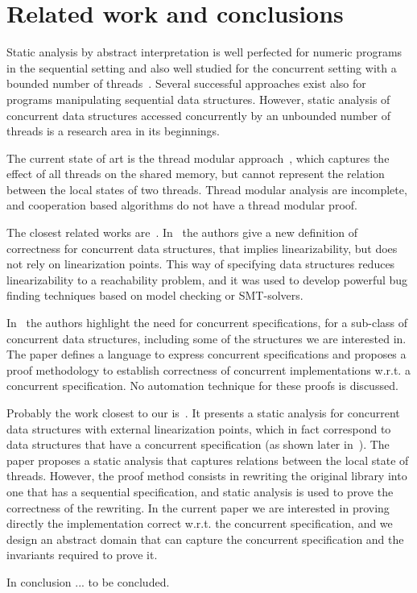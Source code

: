 \section{Related work and conclusions}
\label{sec:relwork}

Static analysis by abstract interpretation is well perfected for numeric programs in the sequential setting and also well studied for the concurrent setting with a bounded number of threads~\cite{mine15,octogons,poly}. 
Several successful approaches exist also for programs manipulating  sequential data structures\cite{SagivRW02,LiBCR17,pldi11}. 
However, static analysis of concurrent data structures accessed concurrently by an unbounded number of threads is a research area in its beginnings. 

The current state of art is the thread modular approach~\cite{threadmodular, Vafeiadis09, vv1}, which  captures the effect of all threads on the shared memory, but cannot represent the relation between the local states of two threads.  Thread modular analysis are incomplete, and cooperation based algorithms do not have a thread modular proof. 

The closest related works are~\cite{cav13,ee1,ee2,ee3,disc15}. 
In~\cite{ee1,ee2,ee3} the authors give a new definition of correctness for concurrent data structures, that implies linearizability, but does not rely on linearization points.  This way of specifying data structures  reduces linearizability to a reachability problem, and it was used to develop powerful bug finding techniques based on model checking or SMT-solvers. 

In~\cite{disc15} the authors highlight the need for concurrent specifications, for a sub-class of concurrent data structures, including some of the structures we are interested in. The paper defines a language to express concurrent specifications and proposes a proof methodology to establish correctness of concurrent implementations w.r.t. a concurrent specification.  No automation technique for these proofs is discussed.  

Probably the work closest to our is~\cite{cav13}. It presents a static analysis for concurrent data structures with external linearization points, which in fact correspond to data structures that have a concurrent specification (as shown later in~\cite{disc15}).  
The paper proposes a static analysis that captures relations between the local state of threads.  
However, the proof method consists in rewriting the original library into one that has a sequential specification, and static analysis is used to prove the correctness of the rewriting. In the current paper we are interested in proving directly the implementation correct w.r.t. the concurrent specification, and we design an abstract domain that can capture the concurrent specification and the invariants required to prove it. 

In conclusion ... to be concluded. 